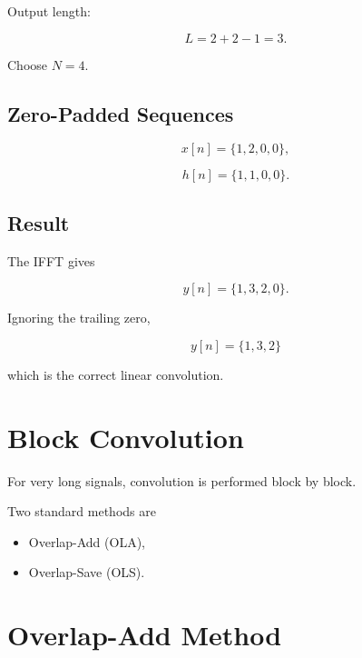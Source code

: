 Output length:

\[
L=2+2-1=3.
\]

Choose \(N=4\).


\subsection{Zero-Padded Sequences}

\[
x[n]=\{1,2,0,0\},
\]

\[
h[n]=\{1,1,0,0\}.
\]


\subsection{Result}

The IFFT gives

\[
\boxed{
y[n]=\{1,3,2,0\}.
}
\]

Ignoring the trailing zero,

\[
\boxed{
y[n]=\{1,3,2\}
}
\]

which is the correct linear convolution.


\section{Block Convolution}

For very long signals, convolution is performed block by block.

Two standard methods are

\begin{itemize}
\item Overlap-Add (OLA),
\item Overlap-Save (OLS).
\end{itemize}


\section{Overlap-Add Method}


